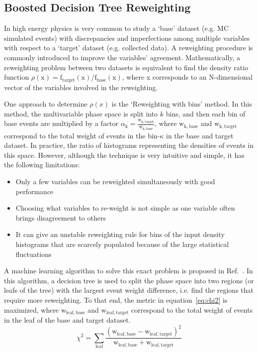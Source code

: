 \subsection{Boosted Decision Tree Reweighting} \label{subsec:bdtr}

In high energy physics is very common to study a `base' dataset (e.g. MC simulated events) with discrepancies and imperfections among multiple variables with respect to a `target' dataset (e.g. collected data). A reweighting procedure is commonly introduced to improve the variables' agreement. Mathematically, a reweighting problem between two datasets is equivalent to find the density ratio function $\rho\mathrm{(x)=f_{target}(x)/f_{base}(x)}$, where x corresponds to an N-dimensional vector of the variables involved in the reweighting.

One approach to determine $\rho(x)$ is the `Reweighting with bins' method. In this method, the multivariable phase space is split into $k$ bins, and then each bin of base events are multiplied by a factor $\alpha\mathrm{_{k}= \frac{w_{k,target}}{w_{k,base}}}$, where $\mathrm{w_{k,base}}$ and $\mathrm{w_{k,target}}$ correspond to the total weight of events in the bin-$\kappa$ in the base and target dataset. In practice, the ratio of histograms representing the densities of events in this space. However, although the technique is very intuitive and simple, it has the following limitations: 
\begin{itemize}
    \item Only a few variables can be reweighted simultaneously with good performance
    \item Choosing what variables to re-weight is not simple as one variable often brings disagreement to others
    \item It can give an unstable reweighting rule for bins of the input density histograms that are scarcely populated because of the large statistical fluctuations
\end{itemize}

A machine learning algorithm to solve this exact problem is proposed in Ref.~\cite{Rogozhnikov:2016bdp}. In this algorithm, a decision tree is used to split the phase space into two regions (or leafs of the tree) with the largest event weight difference, i.e. find the regions that require more reweighting. To that end, the metric in equation~\ref{eq:chi2} is maximized, where $\mathrm{w_{leaf,base}}$ and $\mathrm{w_{leaf,target}}$ correspond to the total weight of events in the leaf of the base and target dataset.
\begin{equation}\label{eq:chi2}
\chi^{2} =  \sum_{ \mathrm{leaf}  }  \mathrm{ \frac{(w_{leaf,base} - w_{leaf,target})^{2} }{ w_{leaf,base} + w_{leaf,target} }   }  
\end{equation}

